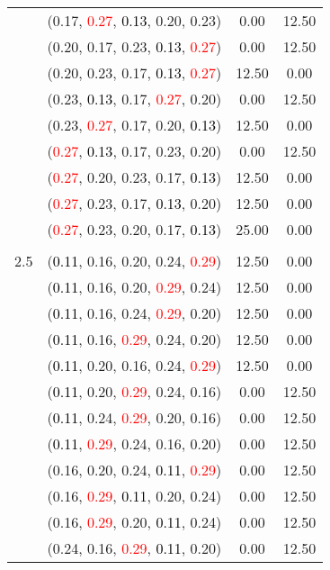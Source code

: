 \documentclass[10pt,a4paper]{report}
\begin{document}
\begin{center}
\begin{longtable}{clcc}
			&(0.17, \textcolor{red}{0.27}, \textcolor{black}{0.13}, 0.20, 0.23)&0.00&12.50\\
			&(0.20, 0.17, 0.23, \textcolor{black}{0.13}, \textcolor{red}{0.27})&0.00&12.50\\
			&(0.20, 0.23, 0.17, \textcolor{black}{0.13}, \textcolor{red}{0.27})&12.50&0.00\\
			&(0.23, \textcolor{black}{0.13}, 0.17, \textcolor{red}{0.27}, 0.20)&0.00&12.50\\
			&(0.23, \textcolor{red}{0.27}, 0.17, 0.20, \textcolor{black}{0.13})&12.50&0.00\\
			&(\textcolor{red}{0.27}, \textcolor{black}{0.13}, 0.17, 0.23, 0.20)&0.00&12.50\\
			&(\textcolor{red}{0.27}, 0.20, 0.23, 0.17, \textcolor{black}{0.13})&12.50&0.00\\
			&(\textcolor{red}{0.27}, 0.23, 0.17, \textcolor{black}{0.13}, 0.20)&12.50&0.00\\
			&(\textcolor{red}{0.27}, 0.23, 0.20, 0.17, \textcolor{black}{0.13})&25.00&0.00\\
		&&&\\
		2.5			&(\textcolor{black}{0.11}, 0.16, 0.20, 0.24, \textcolor{red}{0.29})&12.50&0.00\\
			&(\textcolor{black}{0.11}, 0.16, 0.20, \textcolor{red}{0.29}, 0.24)&12.50&0.00\\
			&(\textcolor{black}{0.11}, 0.16, 0.24, \textcolor{red}{0.29}, 0.20)&12.50&0.00\\
			&(\textcolor{black}{0.11}, 0.16, \textcolor{red}{0.29}, 0.24, 0.20)&12.50&0.00\\
			&(\textcolor{black}{0.11}, 0.20, 0.16, 0.24, \textcolor{red}{0.29})&12.50&0.00\\
			&(\textcolor{black}{0.11}, 0.20, \textcolor{red}{0.29}, 0.24, 0.16)&0.00&12.50\\
			&(\textcolor{black}{0.11}, 0.24, \textcolor{red}{0.29}, 0.20, 0.16)&0.00&12.50\\
			&(\textcolor{black}{0.11}, \textcolor{red}{0.29}, 0.24, 0.16, 0.20)&0.00&12.50\\
			&(0.16, 0.20, 0.24, \textcolor{black}{0.11}, \textcolor{red}{0.29})&0.00&12.50\\
			&(0.16, \textcolor{red}{0.29}, \textcolor{black}{0.11}, 0.20, 0.24)&0.00&12.50\\
			&(0.16, \textcolor{red}{0.29}, 0.20, \textcolor{black}{0.11}, 0.24)&0.00&12.50\\
			&(0.24, 0.16, \textcolor{red}{0.29}, \textcolor{black}{0.11}, 0.20)&0.00&12.50\\

\end{longtable}
\end{center}
\end{document}
